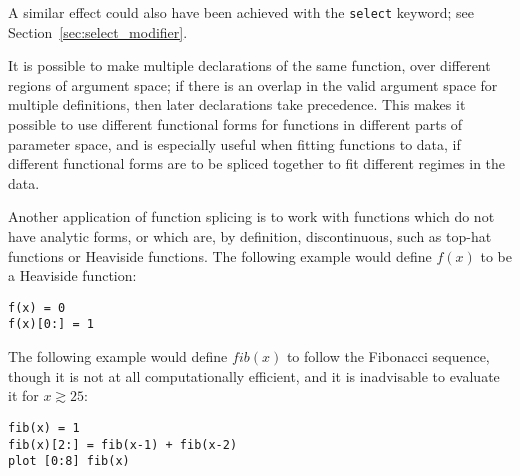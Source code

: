 \noindent A similar effect could also have been achieved with the {\tt select}
keyword; see Section~\ref{sec:select_modifier}.

It is possible to make multiple declarations of the same function, over
different regions of argument space; if there is an overlap in the valid
argument space for multiple definitions, then later declarations take
precedence. This makes it possible to use different functional forms for
functions in different parts of parameter space, and is especially useful when
fitting functions to data, if different functional forms are to be spliced
together to fit different regimes in the data.

Another application of function splicing is to work with functions which do not
have analytic forms, or which are, by definition, discontinuous, such as
top-hat functions or Heaviside functions. The following example would define
$f(x)$ to be a Heaviside function:

\begin{verbatim}
f(x) = 0
f(x)[0:] = 1
\end{verbatim}

\noindent The following example would define $fib(x)$ to follow the Fibonacci
sequence, though it is not at all computationally efficient, and it is
inadvisable to evaluate it for $x\gtrsim25$:

\begin{verbatim}
fib(x) = 1
fib(x)[2:] = fib(x-1) + fib(x-2)
plot [0:8] fib(x)
\end{verbatim}


